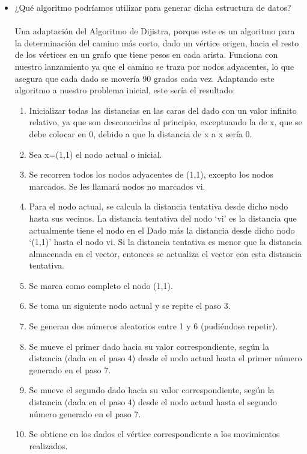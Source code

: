 \documentclass{article}
\begin{document}
\begin{itemize}
		\item{¿Qué algoritmo podríamos utilizar para generar dicha estructura de datos?}\\\\
		Una adaptación del Algoritmo de Dijistra, porque este es un algoritmo para la determinación del camino más corto, dado un vértice origen, hacia el resto de los vértices en un grafo que tiene pesos en cada arista. Funciona con nuestro lanzamiento ya que el camino se traza por nodos adyacentes, lo que asegura que cada dado se movería 90 grados cada vez. Adaptando este algoritmo a nuestro problema inicial, este sería el resultado:
		\begin{enumerate}
		    \item Inicializar todas las distancias en las caras del dado con un valor infinito relativo, ya que son desconocidas al principio, exceptuando la de x, que se debe colocar en 0, debido a que la distancia de x a x sería 0.
		    \item Sea x=(1,1) el nodo actual o inicial.
		    \item Se recorren todos los nodos adyacentes de (1,1), excepto los nodos marcados. Se les llamará nodos no marcados vi.
		    \item Para el nodo actual, se calcula la distancia tentativa desde dicho nodo hasta sus vecinos. La distancia tentativa del nodo ‘vi’ es la distancia que actualmente tiene el nodo en el Dado más la distancia desde dicho nodo ‘(1,1)’ hasta el nodo vi. Si la distancia tentativa es menor que la distancia almacenada en el vector, entonces se actualiza el vector con esta distancia tentativa.
		    \item Se marca como completo el nodo (1,1).
		    \item Se toma un siguiente nodo actual y se repite el paso 3.
		    \item Se generan dos números aleatorios entre 1 y 6 (pudiéndose repetir). 
		    \item Se mueve el primer dado hacia su valor correspondiente, según la distancia (dada en el paso 4) desde el nodo actual hasta el primer número generado en el paso 7.
		    \item Se mueve el segundo dado hacia su valor correspondiente, según la distancia (dada en el paso 4) desde el nodo actual hasta el segundo número generado en el paso 7.
		    \item Se obtiene en los dados el vértice correspondiente a los movimientos realizados.
		\end{enumerate}

\end{itemize}
\end{document}
